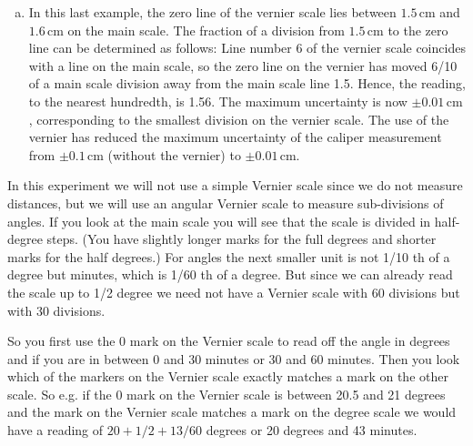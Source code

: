 \begin{enumerate}[a)]
\item In this last example, the zero line of the vernier scale lies between $1.5\,\mathrm{cm}$ and $1.6\,\mathrm{cm}$ on the main scale. The fraction of a division from $1.5\,\mathrm{cm}$ to the zero line can be determined as follows: Line number 6 of the vernier scale coincides with a line on the main scale, so the zero line on the vernier has moved 6/10 of a main scale division away from the main scale line 1.5. Hence, the reading, to the nearest hundredth, is 1.56. The maximum uncertainty is now $\pm 0.01\,\mathrm{cm}$, corresponding to the smallest division on the vernier scale. The use of the vernier has reduced the maximum uncertainty of the caliper measurement from $\pm 0.1\,\mathrm{cm}$ (without the vernier) to $\pm 0.01\,\mathrm{cm}$.
\end{enumerate}

In this experiment we will not use a simple Vernier scale since we do not measure distances, but we will use an angular Vernier scale to measure sub-divisions of angles. If you look at the main scale you will see that the scale is divided in half-degree steps. (You have slightly longer marks for the full degrees and shorter marks for the half degrees.) For angles the next smaller unit is not 1/10 th of a degree but minutes, which is 1/60 th of a degree. But since we can already read the scale up to 1/2 degree we need not have a Vernier scale with 60 divisions but with 30 divisions.\myskip

So you first use the 0 mark on the Vernier scale to read off the angle in degrees and if you are in between 0 and 30 minutes or 30 and 60 minutes. Then you look which of the markers on the Vernier scale exactly matches a mark on the other scale. So e.g. if the 0 mark on the Vernier scale is between 20.5 and 21 degrees and the  mark on the Vernier scale matches a mark on the degree scale we would have a reading of $20 + 1/2+ 13/60$ degrees or 20 degrees and 43 minutes.


